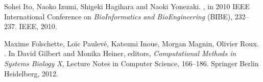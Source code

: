 \begin{frame}[c]
\tcitebullet Sohei Ito, Naoko Izumi, Shigeki Hagihara and Naoki Yonezaki. , in 2010 IEEE International Conference on \textit{BioInformatics and BioEngineering} (BIBE), 232--237. IEEE, 2010.

\tcitebullet Maxime Folschette, Loïc Paulevé, Katsumi Inoue, Morgan Magnin, Olivier Roux. . In David Gilbert and Monika Heiner, editors, \textit{Computational Methods in Systems Biology X}, Lecture Notes in Computer Science, 166--186. Springer Berlin Heidelberg, 2012.




\vfill
\Large
\begin{flushright}
  \hspace{1cm}~
\end{flushright}
\vfill

~

\end{frame}
